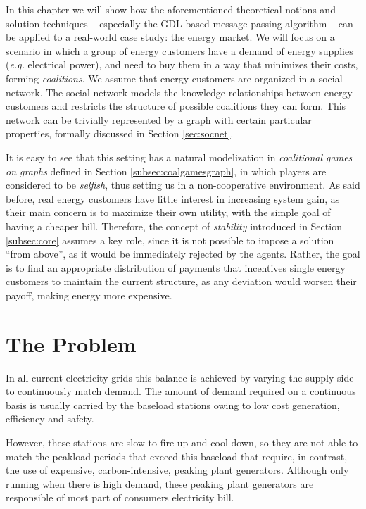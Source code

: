 \documentclass[11pt, twoside, titlepage, a4paper, openright]{report}
\begin{document}
In this chapter we will show how the aforementioned theoretical notions and solution techniques -- especially the GDL-based message-passing algorithm -- can be applied to a real-world case study: the energy market. We will focus on a scenario in which a group of energy customers have a demand of energy supplies (\textit{e.g.} electrical power), and need to buy them in a way that minimizes their costs, forming \textit{coalitions}.
We assume that energy customers are organized in a social network. The social network models the knowledge relationships between energy customers and restricts the structure of possible coalitions they can form. This network can be trivially represented by a graph with certain particular properties, formally discussed in Section \ref{sec:socnet}.

It is easy to see that this setting has a natural modelization in \textit{coalitional games on graphs} defined in Section \ref{subsec:coalgamesgraph}, in which players are considered to be \textit{selfish}, thus setting us in a non-cooperative environment. As said before, real energy customers have little interest in increasing system gain, as their main concern is to maximize their own utility, with the simple goal of having a cheaper bill. Therefore, the concept of \textit{stability} introduced in Section \ref{subsec:core} assumes a key role, since it is not possible to impose a solution ``from above'', as it would be immediately rejected by the agents. 
Rather, the goal is to find an appropriate distribution of payments that incentives single energy customers to maintain the current structure, as any deviation would worsen their payoff, making energy more expensive.

\section{The Problem}

In all current electricity grids this balance is
achieved by varying the supply-side to continuously match demand.
The amount of demand required on a continuous basis is usually carried by the
baseload stations owing to low cost generation, efficiency and safety.

\noindent However, these stations are slow to fire up and cool down, so they are not able to match
the peakload periods that exceed this baseload that
require, in contrast, the use of expensive, carbon-intensive, peaking plant generators.
Although only running when there is high demand, these peaking plant generators are responsible of most part of consumers
electricity bill.
\end{document}
